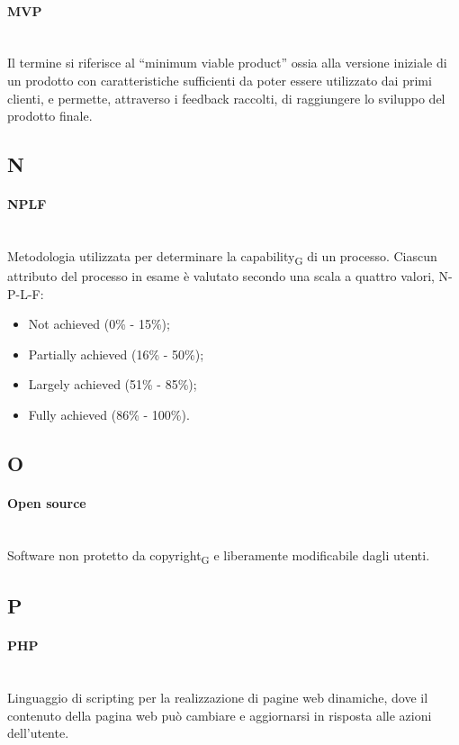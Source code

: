 \paragraph{MVP}~\smallskip \\
Il termine si riferisce al “minimum viable product” ossia alla versione iniziale di un prodotto con 
caratteristiche sufficienti da poter essere utilizzato dai primi clienti, e permette, attraverso i feedback raccolti, di raggiungere lo sviluppo del prodotto finale.
\newpage
{}
\subsection*{N}
\paragraph{NPLF}~\smallskip \\
Metodologia utilizzata per determinare la capability\textsubscript{G} di un processo. Ciascun attributo del processo in esame è valutato secondo una scala a quattro valori, N-P-L-F:
\begin{itemize}
	\item Not achieved (0\% - 15\%);
	\item Partially achieved (16\% - 50\%);
	\item Largely achieved (51\% - 85\%);
    \item Fully achieved (86\% - 100\%).
\end{itemize}
\newpage
{}
\subsection*{O}
\paragraph{Open source}~\smallskip \\
Software non protetto da copyright\textsubscript{G} e liberamente modificabile dagli utenti.
\newpage
{}
\subsection*{P}
\paragraph{PHP}~\smallskip \\
Linguaggio di scripting per la realizzazione di pagine web dinamiche, dove il contenuto della pagina web può cambiare e aggiornarsi in risposta alle azioni dell'utente.

